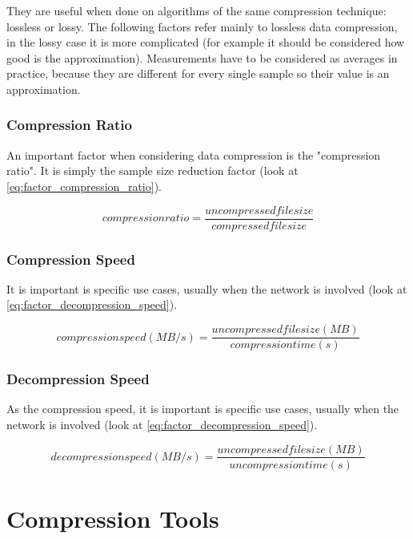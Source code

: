\documentclass[12pt, a4paper]{report}
\begin{document}
They are useful when done on algorithms of the same compression technique: lossless or lossy.
The following factors refer mainly to lossless data compression, in the lossy case it is more complicated (for example it should
be considered how good is the approximation).
Measurements have to be considered as averages in practice, because they are different for every single sample so their value is
an approximation.

\subsection{Compression Ratio}

An important factor when considering data compression is the "compression ratio". It is simply the sample size reduction factor
(look at \autoref{eq:factor_compression_ratio}).

\begin{equation} \label{eq:factor_compression_ratio}
  compression ratio = \frac{uncompressed file size}{compressed file size}
\end{equation}

\subsection{Compression Speed}

It is important is specific use cases, usually when the network is involved (look at \autoref{eq:factor_decompression_speed}).

\begin{equation} \label{eq:factor_compression_speed}
  compression speed (MB / s) = \frac{uncompressed file size (MB)}{compression time (s)}
\end{equation}

\subsection{Decompression Speed}

As the compression speed, it is important is specific use cases, usually when the network is involved (look at
\autoref{eq:factor_decompression_speed}).

\begin{equation} \label{eq:factor_decompression_speed}
  decompression speed (MB / s) = \frac{uncompressed file size (MB)}{uncompression time (s)}
\end{equation}

\chapter{Compression Tools}
\end{document}
